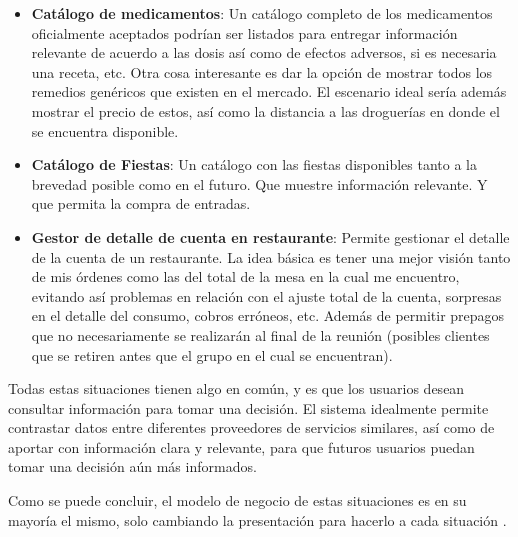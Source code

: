 \begin{itemize}
			\item
				\textbf{Catálogo de medicamentos}: Un catálogo completo de los medicamentos oficialmente aceptados podrían ser listados para entregar información relevante de acuerdo a las dosis así como de efectos adversos, si es necesaria una receta, etc. Otra cosa interesante es dar la opción de mostrar todos los remedios genéricos que existen en el mercado. El escenario ideal sería además mostrar el precio de estos, así como la distancia a las droguerías en donde el \itemCOM se encuentra disponible.
			
			
			\item
				\textbf{Catálogo de Fiestas}: Un catálogo con las fiestas disponibles tanto a la brevedad posible como en el futuro. Que muestre información relevante. Y que permita la compra de entradas.
			
			\item
				\textbf{Gestor de detalle de cuenta en restaurante}: Permite gestionar el detalle de la cuenta de un restaurante. La idea básica es tener una mejor visión tanto de mis órdenes como las del total de la mesa en la cual me encuentro, evitando así problemas en relación con el ajuste total de la cuenta, sorpresas en el detalle del consumo, cobros erróneos, etc. Además de permitir prepagos que no necesariamente se realizarán al final de la reunión (posibles clientes que se retiren antes que el grupo en el cual se encuentran).
			
		\end{itemize}

		Todas estas situaciones tienen algo en común, y es que los usuarios desean consultar información para tomar una decisión. El sistema idealmente permite contrastar datos entre diferentes proveedores de servicios similares, así como de aportar con información clara y relevante, para que futuros usuarios puedan tomar una decisión aún más informados.

				Como se puede concluir, el modelo de negocio de estas situaciones es en su mayoría el mismo, solo cambiando la presentación para hacerlo \adhoc a cada situación \citeAllFrameworks.

